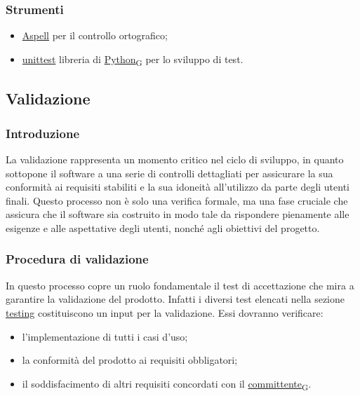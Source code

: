 \subsubsection{Strumenti}

\begin{itemize}
	\item \href{http://aspell.net/}{Aspell} per il controllo ortografico;
	\item \href{https://docs.python.org/3/library/unittest.html}{unittest} libreria di \href{https://7last.github.io/docs/rtb/documentazione-interna/glossario\#python}{Python\textsubscript{G}} per lo sviluppo di test.
\end{itemize}



\subsection{Validazione}
\subsubsection{Introduzione}
La validazione rappresenta un momento critico nel ciclo di sviluppo, in quanto sottopone il software a una serie di controlli dettagliati per assicurare la sua conformità ai requisiti stabiliti e la sua idoneità all'utilizzo da parte degli utenti finali. Questo processo non è solo una verifica formale, ma una fase cruciale che assicura che il software sia costruito in modo tale da rispondere pienamente alle esigenze e alle aspettative degli utenti, nonché agli obiettivi del progetto.

\subsubsection{Procedura di validazione}
In questo processo copre un ruolo fondamentale il test di accettazione che mira a garantire la validazione
del prodotto. Infatti i diversi test elencati nella sezione \underline{\hyperlink{testing}{testing}} costituiscono un input
per la validazione. Essi dovranno verificare:
\begin{itemize}
	\item l'implementazione di tutti i casi d'uso;
	\item la conformità del prodotto ai requisiti obbligatori;
	\item il soddisfacimento di altri requisiti concordati con il \href{https://7last.github.io/docs/rtb/documentazione-interna/glossario\#committente}{committente\textsubscript{G}}.
\end{itemize}

